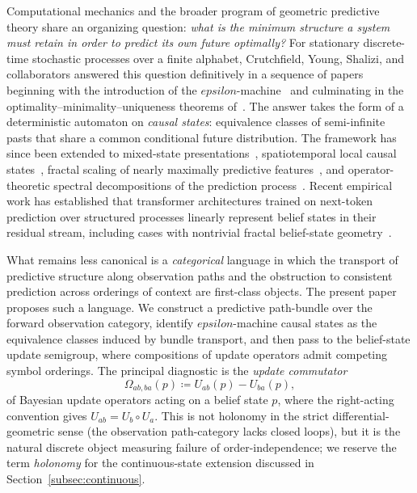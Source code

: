 \documentclass[11pt,a4paper]{article}
\def\varepsilon{epsilon}%
\theoremstyle{plain}
\theoremstyle{definition}
\theoremstyle{remark}
\begin{document}
Computational mechanics and the broader program of geometric predictive theory share an organizing question: \emph{what is the minimum structure a system must retain in order to predict its own future optimally?} For stationary discrete-time stochastic processes over a finite alphabet, Crutchfield, Young, Shalizi, and collaborators answered this question definitively in a sequence of papers beginning with the introduction of the $\varepsilon$-machine~\cite{crutchfield1989} and culminating in the optimality--minimality--uniqueness theorems of~\cite{shalizi2001}. The answer takes the form of a deterministic automaton on \emph{causal states}: equivalence classes of semi-infinite pasts that share a common conditional future distribution. The framework has since been extended to mixed-state presentations~\cite{james2011anatomy}, spatiotemporal local causal states~\cite{rupe2018}, fractal scaling of nearly maximally predictive features~\cite{marzen2017}, and operator-theoretic spectral decompositions of the prediction process~\cite{riechers2018a,riechers2018b}. Recent empirical work has established that transformer architectures trained on next-token prediction over structured processes linearly represent belief states in their residual stream, including cases with nontrivial fractal belief-state geometry~\cite{shai2024}.

What remains less canonical is a \emph{categorical} language in which the transport of predictive structure along observation paths and the obstruction to consistent prediction across orderings of context are first-class objects. The present paper proposes such a language. We construct a predictive path-bundle over the forward observation category, identify $\varepsilon$-machine causal states as the equivalence classes induced by bundle transport, and then pass to the belief-state update semigroup, where compositions of update operators admit competing symbol orderings. The principal diagnostic is the \emph{update commutator}
\begin{equation*}
\Omega_{ab,ba}(p) \coloneqq U_{ab}(p) - U_{ba}(p),
\end{equation*}
of Bayesian update operators acting on a belief state $p$, where the right-acting convention gives $U_{ab} = U_b \circ U_a$. This is not holonomy in the strict differential-geometric sense (the observation path-category lacks closed loops), but it is the natural discrete object measuring failure of order-independence; we reserve the term \emph{holonomy} for the continuous-state extension discussed in Section~\ref{subsec:continuous}.
\end{document}
